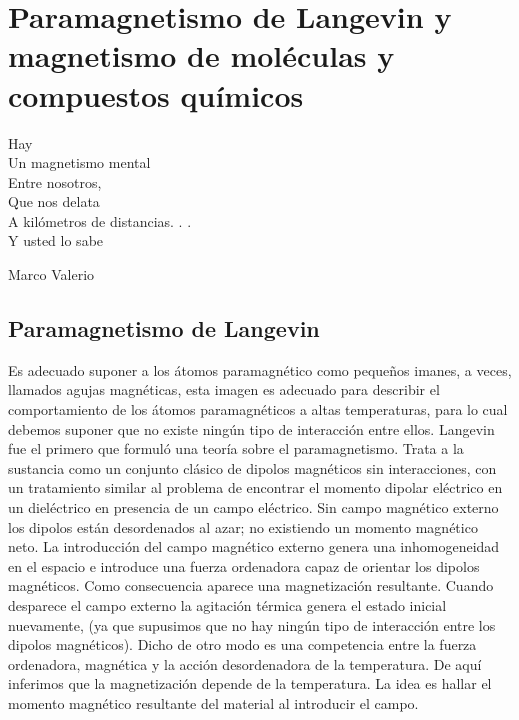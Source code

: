 
\chapter{Paramagnetismo de Langevin y magnetismo de moléculas y compuestos químicos} %

\begin{center}

Hay \\
Un magnetismo mental \\
Entre nosotros, \\
Que nos delata \\
A kilómetros de distancias. . . \\
Y usted lo sabe

\hspace{3.6cm} Marco Valerio\\

\end{center}


\section{Paramagnetismo de Langevin}

Es adecuado suponer a los átomos paramagnético como pequeños imanes, a veces, llamados agujas magnéticas, esta imagen es adecuado para describir el comportamiento de los átomos paramagnéticos a altas temperaturas, para lo cual debemos suponer que no existe ningún tipo de interacción entre ellos. Langevin fue el primero que formuló una teoría sobre el paramagnetismo. Trata a la sustancia como un conjunto clásico de dipolos magnéticos sin interacciones, con un tratamiento similar al problema de encontrar el momento dipolar eléctrico en un dieléctrico en presencia de un campo eléctrico. Sin campo magnético externo los dipolos están desordenados al azar; no existiendo un momento magnético neto. La introducción del campo magnético externo genera una inhomogeneidad en el espacio e introduce una fuerza ordenadora capaz de orientar los dipolos magnéticos. Como consecuencia aparece una magnetización resultante. Cuando desparece el campo externo la agitación térmica genera el estado inicial nuevamente, (ya que supusimos que no hay ningún tipo de interacción entre los dipolos magnéticos). Dicho de otro modo es una competencia entre la fuerza ordenadora, magnética y la acción desordenadora de la temperatura. De aquí inferimos que la magnetización depende de la temperatura. La idea es hallar el momento magnético resultante del material al introducir el campo.


